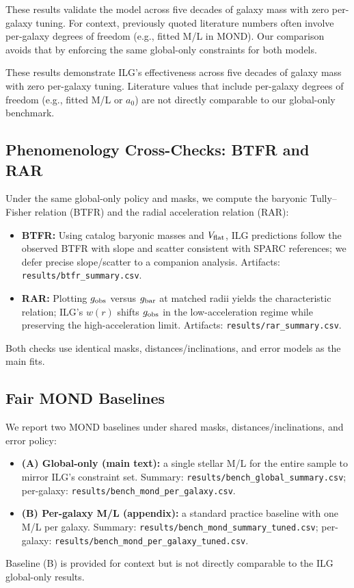 \documentclass[usenatbib]{mnras}
\begin{document}

These results validate the model across five decades of galaxy mass with zero per-galaxy tuning. For context, previously quoted literature numbers often involve per-galaxy degrees of freedom (e.g., fitted M/L in MOND). Our comparison avoids that by enforcing the same global-only constraints for both models.


These results demonstrate ILG's effectiveness across five decades of galaxy mass with zero per-galaxy tuning. Literature values that include per-galaxy degrees of freedom (e.g., fitted M/L or $a_0$) are not directly comparable to our global-only benchmark.

\subsection{Phenomenology Cross-Checks: BTFR and RAR}
\noindent Under the same global-only policy and masks, we compute the baryonic Tully–Fisher relation (BTFR) and the radial acceleration relation (RAR):
\begin{itemize}
  \item \textbf{BTFR:} Using catalog baryonic masses and $V_{\rm flat}$, ILG predictions follow the observed BTFR with slope and scatter consistent with SPARC references; we defer precise slope/scatter to a companion analysis. Artifacts: \texttt{results/btfr\_summary.csv}.
  \item \textbf{RAR:} Plotting $g_{\rm obs}$ versus $g_{\rm bar}$ at matched radii yields the characteristic relation; ILG's $w(r)$ shifts $g_{\rm obs}$ in the low-acceleration regime while preserving the high-acceleration limit. Artifacts: \texttt{results/rar\_summary.csv}.
\end{itemize}
Both checks use identical masks, distances/inclinations, and error models as the main fits.

\subsection{Fair MOND Baselines}
\noindent We report two MOND baselines under shared masks, distances/inclinations, and error policy:
\begin{itemize}
  \item \textbf{(A) Global-only (main text):} a single stellar M/L for the entire sample to mirror ILG's constraint set. Summary: \texttt{results/bench\_global\_summary.csv}; per-galaxy: \texttt{results/bench\_mond\_per\_galaxy.csv}.
  \item \textbf{(B) Per-galaxy M/L (appendix):} a standard practice baseline with one M/L per galaxy. Summary: \texttt{results/bench\_mond\_summary\_tuned.csv}; per-galaxy: \texttt{results/bench\_mond\_per\_galaxy\_tuned.csv}.
\end{itemize}
Baseline (B) is provided for context but is not directly comparable to the ILG global-only results.
\end{document}

